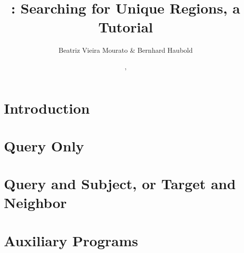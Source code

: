 \documentclass[a4paper]{report}
\begin{document}
\pagestyle{noweb}

\title{: Searching for Unique Regions, a Tutorial}
\author{Beatriz Vieira Mourato \& Bernhard Haubold}
\date{\!\!, }
\maketitle

\tableofcontents

\chapter{Introduction}

\chapter{Query Only}\label{ch:q}


\chapter{Query and Subject, or Target and Neighbor}\label{ch:qs}


\chapter{Auxiliary Programs}

\label{sec:acc}


\end{document}
